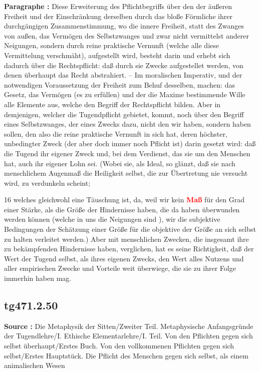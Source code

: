\documentclass[a4paper,12pt,twoside]{book}
\newcommand{\match}[1]{\textcolor{red}{\textbf{#1}}}
\begin{document}
	\textbf{Paragraphe : }Diese Erweiterung des Pflichtbegriffs über den der äußeren Freiheit und der Einschränkung derselben durch das bloße Förmliche ihrer durchgängigen Zusammenstimmung, wo die innere Freiheit, statt des Zwanges von außen, das Vermögen des Selbstzwanges und zwar nicht vermittelst anderer Neigungen, sondern durch reine praktische Vernunft (welche alle diese Vermittelung verschmäht), aufgestellt wird, besteht darin und erhebt sich dadurch über die Rechtspflicht: daß durch sie Zwecke aufgestellet werden, von denen überhaupt das Recht abstrahiert. – Im moralischen Imperativ, und der notwendigen Voraussetzung der Freiheit zum Behuf desselben, machen: das Gesetz, das Vermögen (es zu erfüllen) und der die Maxime bestimmende Wille alle Elemente aus, welche den Begriff der Rechtspflicht bilden. Aber in demjenigen, welcher die Tugendpflicht
	gebietet, kommt, noch über den Begriff eines Selbstzwanges, der eines Zwecks dazu, nicht den wir haben, sondern haben sollen, den also die reine praktische Vernunft in sich hat, deren höchster, unbedingter Zweck (der aber doch immer noch Pflicht ist) darin gesetzt wird: daß die Tugend ihr eigener Zweck und, bei dem Verdienst, das sie um den Menschen hat, auch ihr eigener Lohn sei. (Wobei sie, als Ideal, so glänzt, daß sie nach menschlichem Augenmaß die Heiligkeit selbst, die zur Übertretung nie versucht wird, zu verdunkeln scheint;
	
	
	16
	welches gleichwohl eine Täuschung ist, da, weil wir kein \match{Maß} für den Grad einer Stärke, als die Größe der Hindernisse haben, die da haben überwunden werden können (welche in uns die Neigungen sind ), wir die subjektive Bedingungen der Schätzung einer Größe für die objektive der Größe an sich selbst zu halten verleitet werden.) Aber mit menschlichen Zwecken, die insgesamt ihre zu bekämpfenden Hindernisse haben, verglichen, hat es seine Richtigkeit, daß der Wert der Tugend selbst, als ihres eigenen Zwecks, den Wert alles Nutzens und aller empirischen Zwecke und Vorteile weit überwiege, die sie zu ihrer Folge immerhin haben mag. 
	
	\subsection*{tg471.2.50} 
	\textbf{Source : }Die Metaphysik der Sitten/Zweiter Teil. Metaphysische Anfangsgründe der Tugendlehre/I. Ethische Elementarlehre/I. Teil. Von den Pflichten gegen sich selbst überhaupt/Erstes Buch. Von den vollkommenen Pflichten gegen sich selbst/Erstes Hauptstück. Die Pflicht des Menschen gegen sich selbst, als einem animalischen Wesen\\  
	
\end{document}
